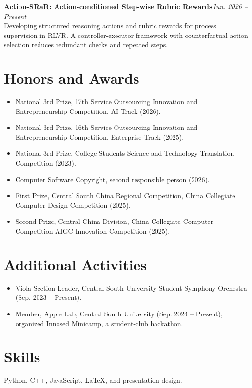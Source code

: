 \documentclass[10pt,a4paper]{article}
\newcommand{\entry}[3]{\noindent\textbf{#1}\hfill\textit{#2}\\#3\par}
\begin{document}
\entry{Action-SRaR: Action-conditioned Step-wise Rubric Rewards}{Jun. 2026 -- Present}{Developing structured reasoning actions and rubric rewards for process supervision in RLVR. A controller-executor framework with counterfactual action selection reduces redundant checks and repeated steps.}

\section{Honors and Awards}
\begin{itemize}
  \item National 3rd Prize, 17th Service Outsourcing Innovation and Entrepreneurship Competition, AI Track (2026).
  \item National 3rd Prize, 16th Service Outsourcing Innovation and Entrepreneurship Competition, Enterprise Track (2025).
  \item National 3rd Prize, College Students Science and Technology Translation Competition (2023).
  \item Computer Software Copyright, second responsible person (2026).
  \item First Prize, Central South China Regional Competition, China Collegiate Computer Design Competition (2025).
  \item Second Prize, Central China Division, China Collegiate Computer Competition AIGC Innovation Competition (2025).
\end{itemize}

\section{Additional Activities}
\begin{itemize}
  \item Viola Section Leader, Central South University Student Symphony Orchestra (Sep. 2023 -- Present).
  \item Member, Apple Lab, Central South University (Sep. 2024 -- Present); organized Innosed Minicamp, a student-club hackathon.
\end{itemize}

\section{Skills}
Python, C++, JavaScript, LaTeX, and presentation design.
\end{document}
